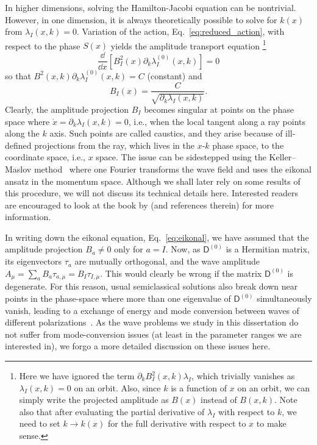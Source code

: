In higher dimensions, solving the Hamilton-Jacobi equation can be nontrivial.
However, in one dimension, it is always theoretically possible to solve for $k(x)$ from $\lambda_{I}(x, k) = 0$.
Variation of the action, Eq.~\eqref{eq:reduced_action}, with respect to the phase $S(x)$ yields the amplitude transport equation%
\footnote{Here we have ignored the term $\partial_{k}{B_{I}^{2}(x,k)}\lambda_{I}$, which trivially vanishes as $\lambda_{I}(x, k) = 0$ on an orbit.
Also, since $k$ is a function of $x$ on an orbit, we can simply write the projected amplitude as $B(x)$ instead of $B(x,k)$.
Note also that after evaluating the partial derivative of $\lambda_{I}$ with respect to $k$, we need to set $k \to k(x)$ for the full derivative with respect to $x$ to make sense.}
%
\begin{equation}
  \frac{\dd}{\dd{x}}\left[B^{2}_{I}(x)\partial_{k}\lambda^{(0)}_{I}(x, k)\right] = 0
\end{equation}
%
so that
$B^{2}(x,k)\partial_{k}\lambda^{(0)}_{I}(x, k) = C$ (constant) and
%
\begin{equation}
  B_{I}(x) = \frac{C}{\sqrt{\partial_{k}\lambda_{I}(x, k)}}.
\end{equation}
%
Clearly, the amplitude projection $B_{I}$ becomes singular at points on the phase space where $\dot{x} = \partial_{k}\lambda_{I}(x, k) = 0$, i.e., when the local tangent along a ray points along the $k$ axis.
Such points are called caustics, and they arise because of ill-defined projections from the ray, which lives in the $x$-$k$ phase space, to the coordinate space, i.e., $x$ space.
The issue can be sidestepped using the Keller--Maslov method~\cite{keller1958,maslov1981} where one Fourier transforms the wave field and uses the eikonal ansatz in the momentum space.
Although we shall later rely on some results of this procedure, we will not discuss its technical details here.
Interested readers are encouraged to look at the book by \citet[Chapter 6]{tracy2014} (and references therein) for more information.

In writing down the eikonal equation, Eq.~\eqref{eq:eikonal}, we have assumed that the amplitude projection $B_{a} \neq 0$ only for $a = I$.
Now, as $\mathsf{D}^{(0)}$ is a Hermitian matrix, its eigenvectors $\tau_{a}$ are mutually orthogonal, and the wave amplitude $A_{\mu} = \sum_{a} B_{a} \tau_{a,\mu} = B_{I}\tau_{I,\mu}$.
This would clearly be wrong if the matrix $\mathsf{D}^{(0)}$ is degenerate.
For this reason, usual semiclassical solutions also break down near points in the phase-space where more than one eigenvalue of $\mathsf{D}^{(0)}$ simultaneously vanish, leading to a exchange of energy and mode conversion between waves of different polarizations~\cite{tracy2014}.
As the wave problems we study in this dissertation do not suffer from mode-conversion issues (at least in the parameter ranges we are interested in), we forgo a more detailed discussion on these issues here.

